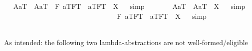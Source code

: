 \begin{isabellebody}
%
\isadelimproof
%
\endisadelimproof
\isanewline
\ \isamarkupfalse%
\ {\isachardoublequoteopen}{\isacharparenleft}{\isasymlparr}A{\isacharbang}{\isacharcomma}a\isactrlsup T{\isasymrparr}\ \isactrlbold {\isasymand}\ {\isasymlparr}A{\isacharbang}{\isacharcomma}a\isactrlsup T{\isasymrparr}\ \isactrlbold {\isasymand}\ \isactrlbold {\isasymbox}{\isacharparenleft}\isactrlbold {\isasymforall}F{\isachardot}\ {\isasymlbrace}a\isactrlsup T{\isacharcomma}F\isactrlsup T{\isasymrbrace}\ \isactrlbold {\isasymequiv}\ {\isasymlbrace}a\isactrlsup T{\isacharcomma}F\isactrlsup T{\isasymrbrace}{\isacharparenright}{\isacharparenright}\ {\isacharequal}\ X{\isachardoublequoteclose}%
\isadelimproof
\ %
\endisadelimproof
%
\isatagproof
{}\isamarkupfalse%
\ simp\ \isamarkupfalse%
\ \ \ %
%
\endisatagproof
{\isafoldproof}%
%
\isadelimproof
%
\endisadelimproof
\isanewline
\ \isamarkupfalse%
\ {\isachardoublequoteopen}{\isacharparenleft}{\isasymlparr}A{\isacharbang}{\isacharcomma}a\isactrlsup T{\isasymrparr}\ \isactrlbold {\isasymand}\ {\isasymlparr}A{\isacharbang}{\isacharcomma}a\isactrlsup T{\isasymrparr}{\isacharparenright}\ {\isacharequal}\ X{\isachardoublequoteclose}%
\isadelimproof
\ %
\endisadelimproof
%
\isatagproof
{}\isamarkupfalse%
\ simp\ \isamarkupfalse%
\ \ \ \ \ \ \ \ \ \ \ \ \ \ \ \ \ \ \ \ \ \ \ \ \ \ \ \ \ %
%
\endisatagproof
{\isafoldproof}%
%
\isadelimproof
%
\endisadelimproof
\isanewline
\ \isamarkupfalse%
\ {\isachardoublequoteopen}\isactrlbold {\isasymbox}{\isacharparenleft}\isactrlbold {\isasymforall}F{\isachardot}\ {\isasymlbrace}a\isactrlsup T{\isacharcomma}F\isactrlsup T{\isasymrbrace}\ \isactrlbold {\isasymequiv}\ {\isasymlbrace}a\isactrlsup T{\isacharcomma}F\isactrlsup T{\isasymrbrace}{\isacharparenright}\ {\isacharequal}\ X{\isachardoublequoteclose}%
\isadelimproof
\ %
\endisadelimproof
%
\isatagproof
{}\isamarkupfalse%
\ simp\ \isamarkupfalse%
\ \ \ \ \ \ \ \ \ \ \ \ \ \ \ \ \ \ \ \ \ \ \ %
%
\endisatagproof
{\isafoldproof}%
%
\isadelimproof
%
\endisadelimproof
%
\begin{isamarkuptext}%
As intended: the following two lambda-abstractions are not well-formed/eligible 

\end{isamarkuptext}
\end{isabellebody}
